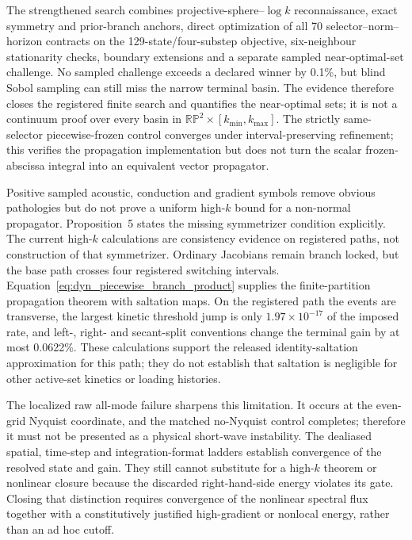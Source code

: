 The strengthened search combines projective-sphere--$\log k$ reconnaissance, exact symmetry and prior-branch anchors, direct optimization of all 70 selector--norm--horizon contracts on the 129-state/four-substep objective, six-neighbour stationarity checks, boundary extensions and a separate sampled near-optimal-set challenge.  No sampled challenge exceeds a declared winner by 0.1\%, but blind Sobol sampling can still miss the narrow terminal basin.  The evidence therefore closes the registered finite search and quantifies the near-optimal sets; it is not a continuum proof over every basin in $\mathbb{RP}^2\times[k_{\min},k_{\max}]$. The strictly same-selector piecewise-frozen control converges under interval-preserving refinement; this verifies the propagation implementation but does not turn the scalar frozen-abscissa integral into an equivalent vector propagator.

Positive sampled acoustic, conduction and gradient symbols remove obvious pathologies but do not prove a uniform high-$k$ bound for a non-normal propagator. Proposition~5 states the missing symmetrizer condition explicitly. The current high-$k$ calculations are consistency evidence on registered paths, not construction of that symmetrizer. Ordinary Jacobians remain branch locked, but the base path crosses four registered switching intervals. Equation~\eqref{eq:dyn_piecewise_branch_product} supplies the finite-partition propagation theorem with saltation maps.  On the registered path the events are transverse, the largest kinetic threshold jump is only $1.97\times10^{-17}$ of the imposed rate, and left-, right- and secant-split conventions change the terminal gain by at most 0.0622\%.  These calculations support the released identity-saltation approximation for this path; they do not establish that saltation is negligible for other active-set kinetics or loading histories.

The localized raw all-mode failure sharpens this limitation. It occurs at the
even-grid Nyquist coordinate, and the matched no-Nyquist control completes;
therefore it must not be presented as a physical short-wave instability. The
dealiased spatial, time-step and integration-format ladders establish
convergence of the resolved state and gain. They still cannot substitute for
a high-$k$ theorem or nonlinear closure because the discarded right-hand-side
energy violates its gate. Closing that distinction requires convergence of
the nonlinear spectral flux together with a constitutively justified
high-gradient or nonlocal energy, rather than an ad hoc cutoff.

